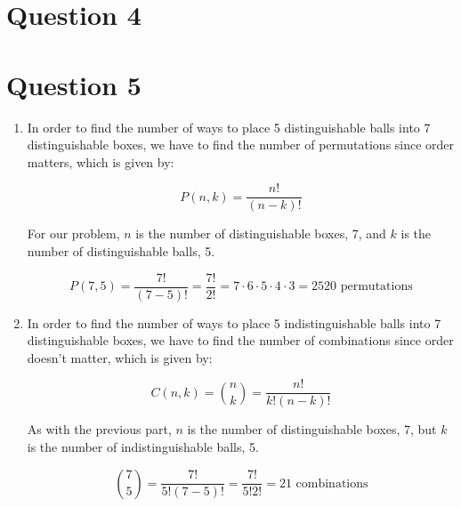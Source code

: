 \documentclass[11pt]{article}
\begin{document}
\section*{Question 4}


\section*{Question 5}
\renewcommand{\labelenumi}{(\alph{enumi})}

\begin{enumerate}
    \item In order to find the number of ways to place 5 distinguishable balls into 7 distinguishable boxes, we have to find the number of permutations since order matters, which is given by: 
    
    \[P(n, k) = \frac{n!}{(n-k)!}\]
    
    For our problem, $n$ is the number of distinguishable boxes, 7, and $k$ is the number of distinguishable balls, 5.
    
    \[P(7, 5) = \frac{7!}{(7-5)!} = \frac{7!}{2!} = 7 \cdot 6 \cdot 5 \cdot 4 \cdot 3 = 2520 \text{ permutations}\]
    
    \item In order to find the number of ways to place 5 indistinguishable balls into 7 distinguishable boxes, we have to find the number of combinations since order doesn't matter, which is given by:
    
    \[C(n, k) = \binom{n}{k} = \frac{n!}{k!(n-k)!}\]
    
    As with the previous part, $n$ is the number of distinguishable boxes, 7, but $k$ is the number of indistinguishable balls, 5.
    
    \[\binom{7}{5} = \frac{7!}{5!(7-5)!} = \frac{7!}{5!2!} = 21 \text{ combinations}\]
\end{enumerate}
\end{document}

